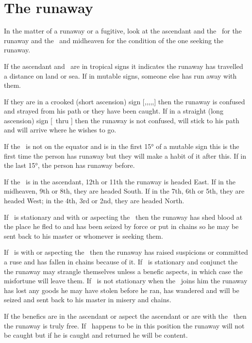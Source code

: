 \section{The runaway}
In the matter of a runaway or a fugitive, look at the ascendant and the \Moon\, for the runaway and the \Sun\, and midheaven for the condition of the one seeking the runaway.

If the ascendant and \Moon\, are in tropical signs it indicates the runaway has travelled a distance on land or sea. If in mutable signs, someone else has run away with them. 

If they are in a crooked (short ascension) sign [\Aries,\Taurus,\Gemini,\Capricorn,\Aquarius,\Pisces] then the runaway is confused and strayed from his path or they have been caught. If in a straight (long ascension) sign [\Cancer\, thru \Sagittarius] then the runaway is not confused, will stick to his path and will arrive where he wishes to go. 

If the \Moon\, is not on the equator and is in the first 15° of a mutable sign this is the first time the person has runaway but they will make a habit of it after this. If in the last 15°, the person has runaway before.

If the \Moon\, is in the ascendant, 12th or 11th the runaway is headed East. If in the midheaven,  9th or 8th, they are headed South. If in the 7th, 6th or 5th, they are headed West; in the 4th, 3rd or 2nd, they are headed North.

If \Mars\, is stationary and with or aspecting the \Moon\, then the runaway has shed blood at the place he fled to and has been seized by force or put in chains so he may be sent back to his master or whomever is seeking them.

If \Saturn\, is with or aspecting the \Moon\, then the runaway has raised suspicions or committed a ruse and has fallen in chains because of it. If \Saturn\, is stationary and conjunct the \Moon\, the runaway may strangle themselves unless a benefic aspects, in which case the misfortune will leave them. If \Saturn\, is not stationary when the \Moon\, joins him the runaway has lost any goods he may have stolen before he ran, has wandered and will be seized and sent back to his master in misery and chains.

If the benefics are in the ascendant or aspect the ascendant or are with the \Moon\, then the runaway is truly free. If \Venus\, happens to be in this position the runaway will not be caught but if he is caught and returned he will be content.

